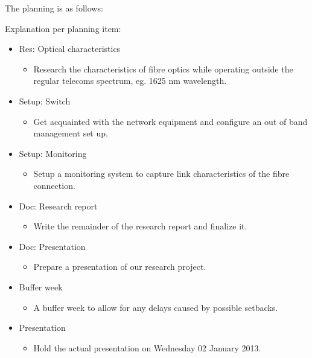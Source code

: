 \documentclass{article}
\begin{document}
The planning is as follows:\\
  \begin{gantt}[xunitlength=50pt]{9}{5}
    \begin{ganttitle}
    \end{ganttitle}
    \begin{ganttitle}
    \end{ganttitle}
  \end{gantt}
\newpage
Explanation per planning item:
\begin{itemize}
  \item Res: Optical characteristics
    \begin{itemize}
      \item Research the characteristics of fibre optics while operating outside the regular telecoms spectrum, eg. 1625 nm wavelength.
    \end{itemize}
  \item Setup: Switch
    \begin{itemize}
      \item Get acquainted with the network equipment and configure an out of band management set up.
    \end{itemize}
  \item Setup: Monitoring
    \begin{itemize}
      \item Setup a monitoring system to capture link characteristics of the fibre connection.
    \end{itemize}
  \item Doc: Research report
    \begin{itemize}
      \item Write the remainder of the research report and finalize it.
    \end{itemize}
  \item Doc: Presentation
    \begin{itemize}
      \item Prepare a presentation of our research project.
    \end{itemize}
  \item Buffer week
    \begin{itemize}
      \item A buffer week to allow for any delays caused by possible setbacks.
    \end{itemize}
  \item Presentation
    \begin{itemize}
      \item Hold the actual presentation on Wednesday 02 January 2013.
    \end{itemize}
\end{itemize}




\end{document}
